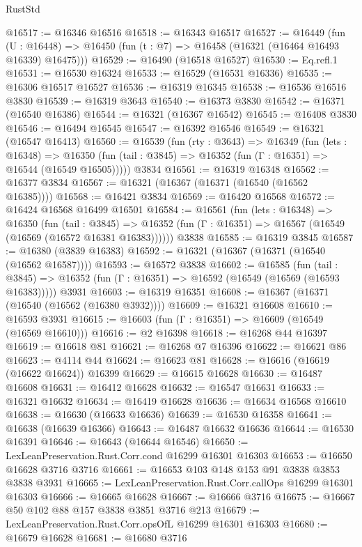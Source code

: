 \begin{lexlean}{RustStd}
\begin{coremodule}
@16517 := @16346 @16516
@16518 := @16343 @16517
@16527 := @16449
    (fun (U : @16448) => @16450 (fun (t : @7) => @16458 (@16321 (@16464 @16493 @16339) @16475)))
@16529 := @16490 (@16518 @16527)
@16530 := Eq.refl.{1}
@16531 := @16530 @16324
@16533 := @16529 (@16531 @16336)
@16535 := @16306 @16517 @16527
@16536 := @16319 @16345
@16538 := @16536 @16516 @3830
@16539 := @16319 @3643
@16540 := @16373 @3830
@16542 := @16371 (@16540 @16386)
@16544 := @16321 (@16367 @16542)
@16545 := @16408 @3830
@16546 := @16494 @16545
@16547 := @16392 @16546
@16549 := @16321 (@16547 @16413)
@16560 := @16539
    (fun (rty : @3643) =>
    @16349
      (fun (lets : @16348) =>
      @16350 (fun (tail : @3845) => @16352 (fun (Γ : @16351) => @16544 (@16549 @16505)))))
    @3834
@16561 := @16319 @16348
@16562 := @16377 @3834
@16567 := @16321 (@16367 (@16371 (@16540 (@16562 @16385))))
@16568 := @16421 @3834
@16569 := @16420 @16568
@16572 := @16424 @16568 @16499 @16501
@16584 := @16561
    (fun (lets : @16348) =>
    @16350
      (fun (tail : @3845) =>
      @16352 (fun (Γ : @16351) => @16567 (@16549 (@16569 (@16572 @16381 @16383))))))
    @3838
@16585 := @16319 @3845
@16587 := @16380 (@3839 @16383)
@16592 := @16321 (@16367 (@16371 (@16540 (@16562 @16587))))
@16593 := @16572 @3838
@16602 := @16585
    (fun (tail : @3845) => @16352 (fun (Γ : @16351) => @16592 (@16549 (@16569 (@16593 @16383)))))
    @3931
@16603 := @16319 @16351
@16608 := @16367 (@16371 (@16540 (@16562 (@16380 @3932))))
@16609 := @16321 @16608
@16610 := @16593 @3931
@16615 := @16603 (fun (Γ : @16351) => @16609 (@16549 (@16569 @16610)))
@16616 := @2 @16398
@16618 := @16268 @44 @16397
@16619 := @16618 @81
@16621 := @16268 @7 @16396
@16622 := @16621 @86
@16623 := @4114 @44
@16624 := @16623 @81
@16628 := @16616 (@16619 (@16622 @16624)) @16399
@16629 := @16615 @16628
@16630 := @16487 @16608
@16631 := @16412 @16628
@16632 := @16547 @16631
@16633 := @16321 @16632
@16634 := @16419 @16628
@16636 := @16634 @16568 @16610
@16638 := @16630 (@16633 @16636)
@16639 := @16530 @16358
@16641 := @16638 (@16639 @16366)
@16643 := @16487 @16632 @16636
@16644 := @16530 @16391
@16646 := @16643 (@16644 @16546)
@16650 := LexLeanPreservation.Rust.Corr.cond @16299 @16301 @16303
@16653 := @16650 @16628 @3716 @3716
@16661 := @16653 @103 @148 @153 @91 @3838 @3853 @3838 @3931
@16665 := LexLeanPreservation.Rust.Corr.callOps @16299 @16301 @16303
@16666 := @16665 @16628
@16667 := @16666 @3716
@16675 := @16667 @50 @102 @88 @157 @3838 @3851 @3716 @213
@16679 := LexLeanPreservation.Rust.Corr.opsOfL @16299 @16301 @16303
@16680 := @16679 @16628
@16681 := @16680 @3716

\end{coremodule}
\end{lexlean}
